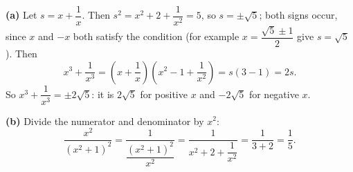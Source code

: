 \textbf{(a)} Let $s=x+\dfrac{1}{x}$. Then $s^2=x^2+2+\dfrac{1}{x^2}=5$, so $s=\pm\sqrt5$; both signs occur, since $x$ and $-x$ both satisfy the condition (for example $x=\dfrac{\sqrt5\pm1}{2}$ give $s=\sqrt5$). Then
\[
x^3+\dfrac{1}{x^3}=\left(x+\dfrac{1}{x}\right)\left(x^2-1+\dfrac{1}{x^2}\right)=s(3-1)=2s .
\]
So $x^3+\dfrac{1}{x^3}=\boxed{\pm2\sqrt5}$: it is $2\sqrt5$ for positive $x$ and $-2\sqrt5$ for negative $x$.

\textbf{(b)} Divide the numerator and denominator by $x^2$:
\[
\dfrac{x^2}{(x^2+1)^2}=\dfrac{1}{\dfrac{(x^2+1)^2}{x^2}}=\dfrac{1}{x^2+2+\dfrac{1}{x^2}}=\dfrac{1}{3+2}=\boxed{\dfrac{1}{5}}.
\]
